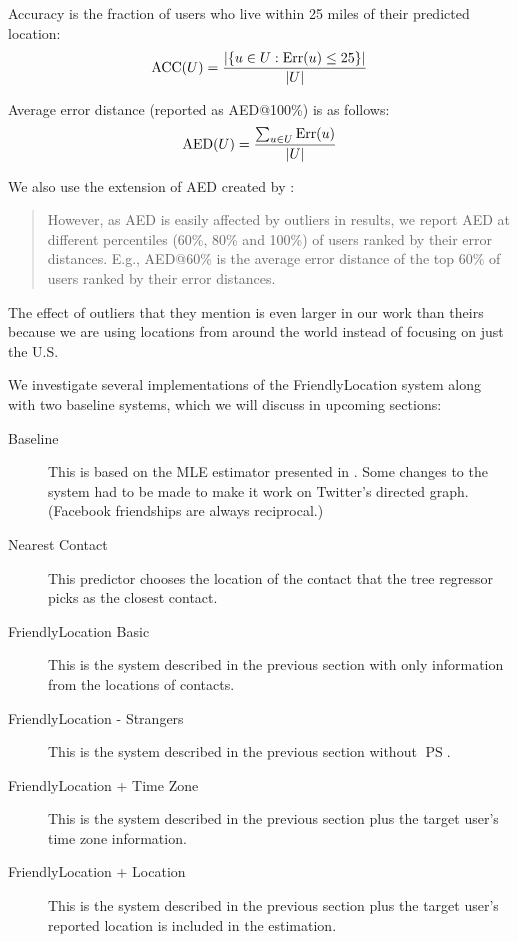 \documentclass[letterpaper]{article}
\DeclareMathOperator{\pStrangers}{PS}
\DeclareMathOperator{\Err}{Err}
\DeclareMathOperator{\AED}{AED}
\DeclareMathOperator{\ACC}{ACC}
\begin{document}
Accuracy is the fraction of users who live within 25 miles of their predicted
location:
\[
    \ACC(U) = { |\{ u \in U : \Err(u)\le25 \}| \over |U| }
\]

Average error distance (reported as AED@100\%) is as follows:
\[
    \AED(U) = { \sum_{u \in U} \Err(u) \over |U| }
\]

We also use the extension of AED created by \cite{li2012towards}:
\begin{quote}
However, as AED is easily affected by outliers in results, we report AED at
different percentiles (60\%, 80\% and 100\%) of users ranked by their error
distances. E.g., AED@60\% is the average error distance of the top 60\% of
users ranked by their error distances.
\end{quote}
The effect of outliers that they mention is even larger in our work than theirs
because we are using locations from around the world instead of focusing on
just the U.S.

We investigate several implementations of the FriendlyLocation system along
with two baseline systems, which we will discuss in upcoming sections:
\begin{description}
\item[Baseline] This is based on the MLE estimator presented in
    \cite{backstrom2010find}. Some changes to the system had to be made to make it
    work on Twitter's directed graph. (Facebook friendships are always
    reciprocal.)
\item[Nearest Contact] This predictor chooses the location of the contact that
    the tree regressor picks as the closest contact.
\item[FriendlyLocation Basic] This is the system described in the previous
    section with only information from the locations of contacts.
\item[FriendlyLocation - Strangers] This is the system described in the previous
    section without $\pStrangers$.
\ifdefined\THESIS
\item[FriendlyLocation + Time Zone] This is the system described in the previous
    section plus the target user's time zone information.
\fi
\item[FriendlyLocation + Location] This is the system described in the previous
    section plus the target user's reported location is included in the
    estimation.
\end{description}
\end{document}

